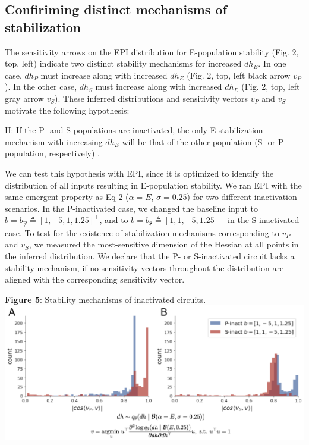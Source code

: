 \documentclass[11pt]{article}
\begin{document}
\subsection{Confiriming distinct mechanisms of stabilization}
The sensitivity arrows on the EPI distribution for E-population stability (Fig. 2, top, left) indicate two distinct stability mechanisms for increased $dh_E$.
In one case, $dh_P$ must increase along with increased $dh_E$ (Fig. 2, top, left black arrow $v_P$).
In the other case, $dh_S$ must increase along with increased $dh_E$ (Fig. 2, top, left gray arrow $v_S$).
These inferred distributions and sensitivity vectors $v_P$ and $v_S$ motivate the following hypothesis:

H: If the P- and S-populations are inactivated, the only E-stabilization mechanism with increasing $dh_E$ will be that of the other population (S- or P-population, respectively) .

We can test this hypothesis with EPI, since it is optimized to identify the distribution of all inputs resulting in E-population stability.
We ran EPI with the same emergent property as Eq 2 ($\alpha=E$, $\sigma=0.25$) for two different inactivation scenarios.
In the P-inactivated case, we changed the baseline input to $b =b_{\not P} \triangleq \left[ 1, -5, 1 ,1.25 \right]^\top$, and to $b =b_{\not S} \triangleq \left[ 1, 1, -5 ,1.25 \right]^\top$ in the S-inactivated case.
To test for the existence of stabilization mechanisms corresponding to $v_P$ and $v_S$, we measured the most-sensitive dimension of the Hessian at all points in the inferred distribution.  
We declare that the P- or S-inactivated circuit lacks a stability mechanism, if no sensitivity vectors throughout the distribution are aligned with the corresponding sensitivity vector.

\begin{center}
\textbf{Figure 5}: Stability mechanisms of inactivated circuits.
\includegraphics[scale=.5]{figs/cos_dists.pdf}
\end{center}
\end{document}
